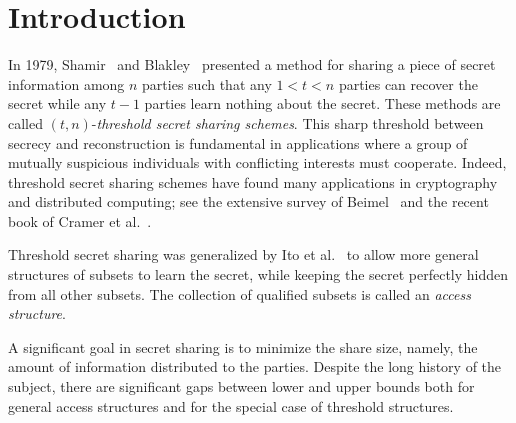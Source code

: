 \documentclass{toc}
\begin{document}
%
%
%

\newcommand{\party}{\mathsf p}
\newcommand{\parties}{\mathcal P}
\newcommand{\share}{\sigma}
\newcommand{\shares}{\sigma}
\newcommand{\SHARE}{\mathsf{SHARE}}
\newcommand{\RECON}{\mathsf{RECON}}

\newcommand{\secret}{s}
\newcommand{\thr}[2]{\mathsf{THR}_{#1}^{#2}}
\newcommand{\ramp}[2]{\mathsf{RAMP}_{#1}^{#2}}
\newcommand\F{\mathbb F}
\def\B{\{0,1\}}
\def\eps{\varepsilon}
\def\xor{\oplus}
\def\implies{\Rightarrow}
\def\cond{\mid}
\def\sign{\mathrm{sign}}

\def\calA{\mathcal{A}}
\def\calB{\mathcal{B}}
\def\calS{\mathcal{S}}
\def\calSmax{\hat{\mathcal{S}}}
\def\calR{\mathcal{R}}
\def\calP{\mathcal{P}}

\providecommand\floor[1]{\lfloor#1\rfloor}
\providecommand\ceil[1]{\lceil#1\rceil}
\providecommand\blog[1]{\log_2\ceil{#1}}
\providecommand\abs[1]{\lvert#1\rvert}
\providecommand\compl[1]{#1^{\complement}}
\providecommand\norm[1]{\|#1\|}
\providecommand\bigabs[1]{\bigl\lvert#1\bigr\rvert}
\providecommand\ip[1]{\langle#1\rangle}



\section{Introduction}
In 1979, Shamir~\cite{Shamir79} and Blakley~\cite{Blakley79} presented a method
for sharing a piece of secret information among $n$ parties such that any
$1<t<n$ parties can recover the secret while any $t-1$ parties learn 
	nothing about the secret. These methods are called $(t,n)$-\emph{threshold
	secret sharing schemes}. This sharp threshold between secrecy and
reconstruction is fundamental in applications where a group of mutually
suspicious individuals with conflicting interests must cooperate. Indeed,
threshold secret sharing schemes have found many applications in cryptography
and distributed computing; see the extensive survey of Beimel~\cite{Beimel11}
and the recent book of Cramer et al.~\cite{CDN2015}.

Threshold secret sharing was generalized by Ito et al.~\cite{ISN93} to 
allow more general structures of subsets to learn the
secret, while keeping the secret perfectly hidden from all other subsets. The
collection of qualified subsets is called an \emph{access structure}.

A significant goal in secret sharing is to minimize the share size, namely, the
amount of information distributed to the parties. Despite the long history of the
subject, there are significant gaps between lower and upper bounds both
for general access structures and for the special case of threshold structures.
\end{document}
